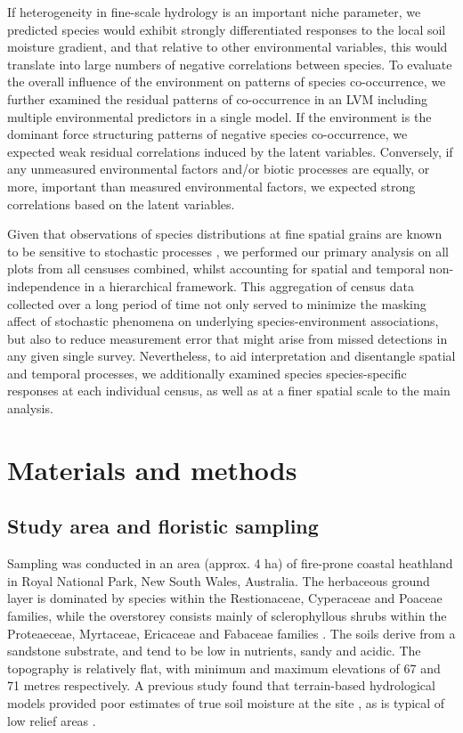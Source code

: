 If heterogeneity in fine-scale hydrology is an important niche parameter, we predicted species would exhibit strongly differentiated responses to the local soil moisture gradient, and that relative to other environmental variables, this would translate into large numbers of negative correlations between species. To evaluate the overall influence of the environment on patterns of species co-occurrence, we further examined the residual patterns of co-occurrence in an LVM including multiple environmental predictors in a single model. If the environment is the dominant force structuring patterns of negative species co-occurrence, we expected weak residual correlations induced by the latent variables. Conversely, if any unmeasured environmental factors and/or biotic processes are equally, or more, important than measured environmental factors, we expected strong correlations based on the latent variables. 

Given that observations of species distributions at fine spatial grains are known to be sensitive to stochastic processes \citep{Chase2014}, we performed our primary analysis on all plots from all censuses combined, whilst accounting for spatial and temporal non-independence in a hierarchical framework. This aggregation of census data collected over a long period of time not only served to minimize the masking affect of stochastic phenomena on underlying species-environment associations, but also to reduce measurement error that might arise from missed detections in any given single survey. Nevertheless, to aid interpretation and disentangle spatial and temporal processes, we additionally examined species species-specific responses at each individual census, as well as at a finer spatial scale to the main analysis.

\section{Materials and methods}

\subsection{Study area and floristic sampling}

Sampling was conducted in an area (approx. 4 ha) of fire-prone coastal heathland in Royal National Park, New South Wales, Australia. The herbaceous ground layer is dominated by species within the Restionaceae, Cyperaceae and Poaceae families, while the overstorey consists mainly of sclerophyllous shrubs within the Proteaeceae, Myrtaceae, Ericaceae and Fabaceae families \citep{KEITH2007}. The soils derive from a sandstone substrate, and tend to be low in nutrients, sandy and acidic. The topography is relatively flat, with minimum and maximum elevations of 67 and 71 metres respectively. A previous study found that terrain-based hydrological models provided poor estimates of true soil moisture at the site \citep{Holman1999}, as is typical of low relief areas \citep{Anderson1980}.

